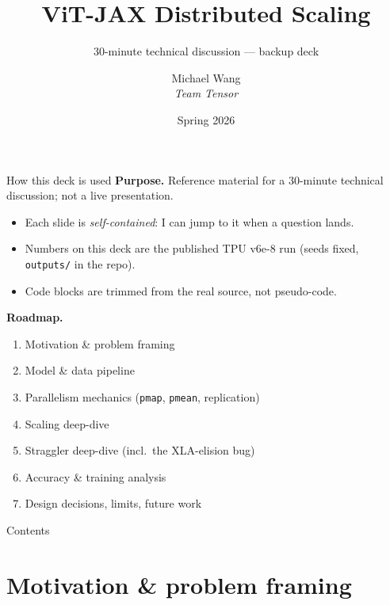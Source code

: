 \documentclass[aspectratio=169,10pt]{beamer}
\title{ViT-JAX Distributed Scaling}
\subtitle{30-minute technical discussion — backup deck}
\author{Michael Wang \\ \textit{\small Team Tensor}}
\institute{CS 390 — Distributed Systems · Duke University}
\date{Spring 2026}
\begin{document}
\begin{frame}[plain]\titlepage\end{frame}

\begin{frame}{How this deck is used}
  \textbf{Purpose.} Reference material for a 30-minute technical discussion; not
  a live presentation.
  \vspace{0.4em}
  \begin{itemize}
    \item Each slide is \emph{self-contained}: I can jump to it when a question lands.
    \item Numbers on this deck are the published TPU v6e-8 run
          (seeds fixed, \texttt{outputs/} in the repo).
    \item Code blocks are trimmed from the real source, not pseudo-code.
  \end{itemize}
  \vspace{0.6em}
  \textbf{Roadmap.}
  \begin{enumerate}\small
    \item Motivation \& problem framing
    \item Model \& data pipeline
    \item Parallelism mechanics (\texttt{pmap}, \texttt{pmean}, replication)
    \item Scaling deep-dive
    \item Straggler deep-dive (incl.\ the XLA-elision bug)
    \item Accuracy \& training analysis
    \item Design decisions, limits, future work
  \end{enumerate}
\end{frame}

\begin{frame}{Contents}\tableofcontents\end{frame}

\section{Motivation \& problem framing}
\end{document}
